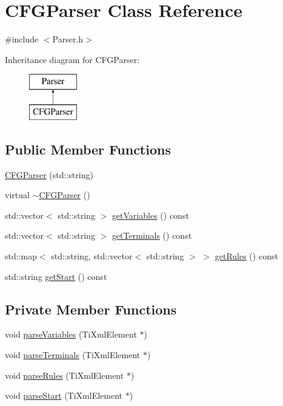 \hypertarget{classCFGParser}{\section{\-C\-F\-G\-Parser \-Class \-Reference}
\label{da/d24/classCFGParser}
}


{\ttfamily \#include $<$\-Parser.\-h$>$}

\-Inheritance diagram for \-C\-F\-G\-Parser\-:\begin{figure}[H]
\begin{center}
\leavevmode
\includegraphics[height=2.000000cm]{da/d24/classCFGParser}
\end{center}
\end{figure}
\subsection*{\-Public \-Member \-Functions}
\begin{DoxyCompactItemize}
\item 
\hyperlink{classCFGParser_ab92c03dd2a8d901fb38b468c97ee879d}{\-C\-F\-G\-Parser} (std\-::string)
\item 
virtual \hyperlink{classCFGParser_a52b7730ad87bfb47fcc100dc6b2756ee}{$\sim$\-C\-F\-G\-Parser} ()
\item 
std\-::vector$<$ std\-::string $>$ \hyperlink{classCFGParser_a91c3dfa2ce514b1066eb4d86af311804}{get\-Variables} () const 
\item 
std\-::vector$<$ std\-::string $>$ \hyperlink{classCFGParser_aef1d5758fe648f2ab93220816bdd9a84}{get\-Terminals} () const 
\item 
std\-::map$<$ std\-::string, \*
std\-::vector$<$ std\-::string $>$ $>$ \hyperlink{classCFGParser_abf6237f25b52dd05009220a8d10c3449}{get\-Rules} () const 
\item 
std\-::string \hyperlink{classCFGParser_af4336389c220320c7d9511fffafddfae}{get\-Start} () const 
\end{DoxyCompactItemize}
\subsection*{\-Private \-Member \-Functions}
\begin{DoxyCompactItemize}
\item 
void \hyperlink{classCFGParser_ad743c15b7790fcd172b8a1ef7ece1473}{parse\-Variables} (\-Ti\-Xml\-Element $\ast$)
\item 
void \hyperlink{classCFGParser_a525642f6ee69770c435e855e0609fa32}{parse\-Terminals} (\-Ti\-Xml\-Element $\ast$)
\item 
void \hyperlink{classCFGParser_a681f962f987adf57ba9ff8b3638fef14}{parse\-Rules} (\-Ti\-Xml\-Element $\ast$)
\item 
void \hyperlink{classCFGParser_a1ca52cabb5cf726a0eb7a2668c3c0a5a}{parse\-Start} (\-Ti\-Xml\-Element $\ast$)
\end{DoxyCompactItemize}
